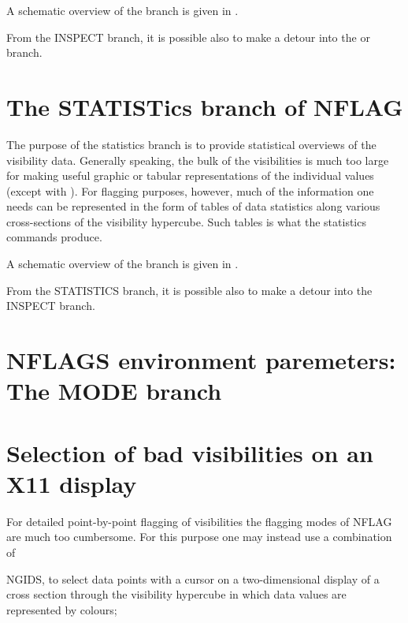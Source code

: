 	A schematic overview of the branch is given in .

	From the INSPECT branch, it is possible also to make a detour into the
 or  branch.


\section{ The STATISTics branch of NFLAG}
\label{.statist.branch}



	The purpose of the statistics branch is to provide statistical
overviews of the visibility data. Generally speaking, the bulk of the
visibilities is much too large for making useful graphic or tabular
representations of the individual values (except with ). For
flagging purposes, however, much of the information one needs can be
represented in the form of tables of data statistics along various
cross-sections of the visibility hypercube. Such tables is what the statistics
commands produce.

	A schematic overview of the branch is given in .

	From the STATISTICS branch, it is possible also to make a detour into
the INSPECT branch.


\section{ NFLAGS environment paremeters: The MODE branch}
\label{.mode.branch}

%



\section{ Selection of bad visibilities on an X11 display }
\label{.x11}



	For detailed point-by-point flagging of visibilities the flagging modes
of NFLAG are much too cumbersome. For this purpose one may instead use a
combination of
\bi
\item   NGIDS, to select data points with a cursor on a two-dimensional display
of a cross section through the visibility hypercube in which data values are
represented by colours;

